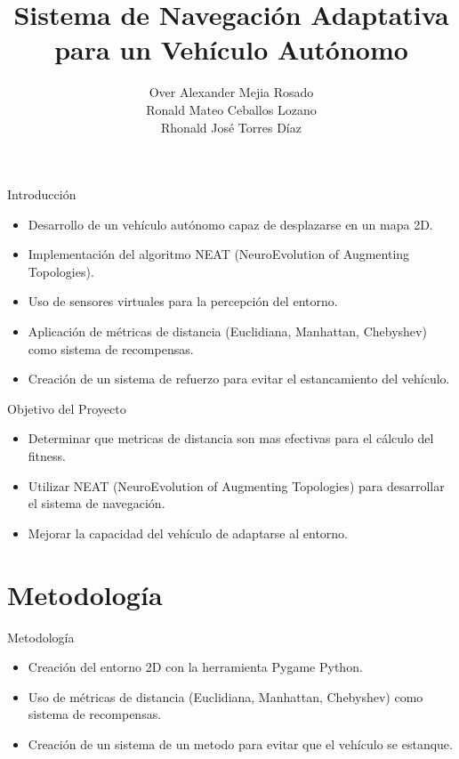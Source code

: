 \documentclass{beamer}
\title{Sistema de Navegación Adaptativa para un Vehículo Autónomo}
\author{
    Over Alexander Mejia Rosado \\
    Ronald Mateo Ceballos Lozano \\
    Rhonald José Torres Díaz
}
\institute{\textit{Inteligencia Artificial} \\
Universidad Nacional de Colombia - De La Paz}
\date{}
\begin{document}
\begin{frame}
    \titlepage
\end{frame}

\begin{frame}{Introducción}
    \begin{itemize}
        \item Desarrollo de un vehículo autónomo capaz de desplazarse en un mapa 2D.
        \item Implementación del algoritmo NEAT (NeuroEvolution of Augmenting Topologies).
        \item Uso de sensores virtuales para la percepción del entorno.
        \item Aplicación de métricas de distancia (Euclidiana, Manhattan, Chebyshev) como sistema de recompensas.
        \item Creación de un sistema de refuerzo para evitar el estancamiento del vehículo.
    \end{itemize}
\end{frame}

\begin{frame}{Objetivo del Proyecto}
    \begin{itemize}
        \item Determinar que metricas de distancia son mas efectivas para el cálculo del fitness.
        \item Utilizar NEAT (NeuroEvolution of Augmenting Topologies) para desarrollar el sistema de navegación.
        \item Mejorar la capacidad del vehículo de adaptarse al entorno.
    \end{itemize}
\end{frame}

\section{Metodología}

\begin{frame}{Metodología}
    \begin{itemize}
        \item Creación del entorno 2D con la herramienta Pygame Python.
        \item Uso de métricas de distancia (Euclidiana, Manhattan, Chebyshev) como sistema de recompensas.
        \item Creación de un sistema de un metodo para evitar que el vehículo se estanque.
    \end{itemize}
\end{frame}
\end{document}
